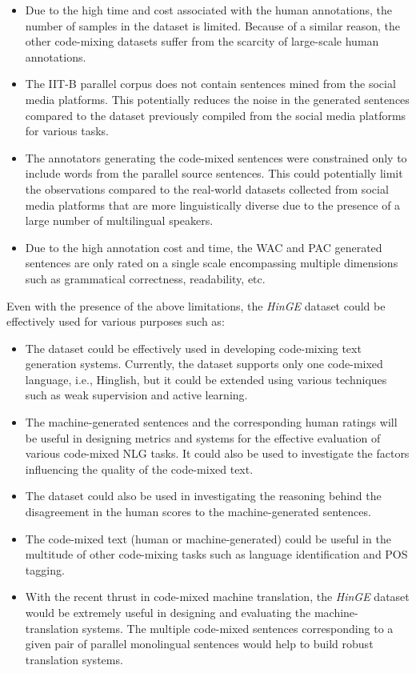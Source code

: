 \documentclass[11pt]{article}
\begin{document}
\begin{itemize}
    \item Due to the high time and cost associated with the human annotations, the number of samples in the dataset is limited. Because of a similar reason, the other code-mixing datasets \cite{srivastava2021challenges} suffer from the scarcity of large-scale human annotations.
    \item The IIT-B parallel corpus does not contain sentences mined from the social media platforms. This potentially reduces the noise in the generated sentences compared to the dataset previously compiled from the social media platforms for various tasks.
    \item The annotators generating the code-mixed sentences were constrained only to include words from the parallel source sentences. This could potentially limit the observations compared to the real-world datasets collected from social media platforms that are more linguistically diverse due to the presence of a large number of multilingual speakers.
    \item Due to the high annotation cost and time, the WAC and PAC generated sentences are only rated on a single scale encompassing multiple dimensions such as grammatical correctness, readability, etc.    
\end{itemize}

Even with the presence of the above limitations, the \textit{HinGE} dataset could be effectively used for various purposes such as:

\begin{itemize}
    \item The dataset could be effectively used in developing code-mixing text generation systems. Currently, the dataset supports only one code-mixed language, i.e., Hinglish, but it could be extended using various techniques such as weak supervision and active learning.
    \item The machine-generated sentences and the corresponding human ratings will be useful in designing metrics and systems for the effective evaluation of various code-mixed NLG tasks. It could also be used to investigate the factors influencing the quality of the code-mixed text.
    \item The dataset could also be used in investigating the reasoning behind the disagreement in the human scores to the machine-generated sentences.
    \item The code-mixed text (human or machine-generated) could be useful in the multitude of other code-mixing tasks such as language identification and POS tagging.
    \item With the recent thrust in code-mixed machine translation, the \textit{HinGE} dataset would be extremely useful in designing and evaluating the machine-translation systems. The multiple code-mixed sentences corresponding to a given pair of parallel monolingual sentences would help to build robust translation systems.
\end{itemize}
\end{document}
